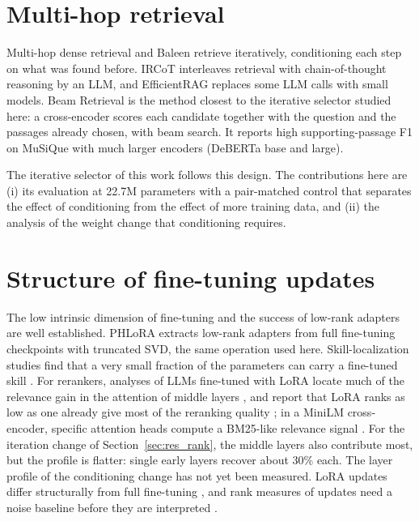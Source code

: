 \section{Multi-hop retrieval}

Multi-hop dense retrieval \cite{xiong2021mdr} and Baleen \cite{khattab2021baleen} retrieve iteratively, conditioning each step on what was found before. IRCoT \cite{trivedi2023ircot} interleaves retrieval with chain-of-thought reasoning by an LLM, and EfficientRAG \cite{zhuang2024efficientrag} replaces some LLM calls with small models. Beam Retrieval \cite{zhang2024beamretrieval} is the method closest to the iterative selector studied here: a cross-encoder scores each candidate together with the question and the passages already chosen, with beam search. It reports high supporting-passage F1 on MuSiQue with much larger encoders (DeBERTa base and large).

The iterative selector of this work follows this design. The contributions here are (i) its evaluation at 22.7M parameters with a pair-matched control that separates the effect of conditioning from the effect of more training data, and (ii) the analysis of the weight change that conditioning requires.

\section{Structure of fine-tuning updates}

The low intrinsic dimension of fine-tuning \cite{li2018intrinsic,aghajanyan2021intrinsic} and the success of low-rank adapters \cite{hu2022lora} are well established. PHLoRA \cite{vasani2025phlora} extracts low-rank adapters from full fine-tuning checkpoints with truncated SVD, the same operation used here. Skill-localization studies find that a very small fraction of the parameters can carry a fine-tuned skill \cite{panigrahi2023skilllocalization}. For rerankers, analyses of LLMs fine-tuned with LoRA locate much of the relevance gain in the attention of middle layers \cite{perlman2026emergence}, and report that LoRA ranks as low as one already give most of the reranking quality \cite{nijasure2025howrelevance}; in a MiniLM cross-encoder, specific attention heads compute a BM25-like relevance signal \cite{lu2025pathway}. For the iteration change of Section~\ref{sec:res_rank}, the middle layers also contribute most, but the profile is flatter: single early layers recover about 30\% each. The layer profile of the conditioning change has not yet been measured. LoRA updates differ structurally from full fine-tuning \cite{biderman2024loralearnsless,shuttleworth2025illusion}, and rank measures of updates need a noise baseline before they are interpreted \cite{altaf2026noisebaseline}.

